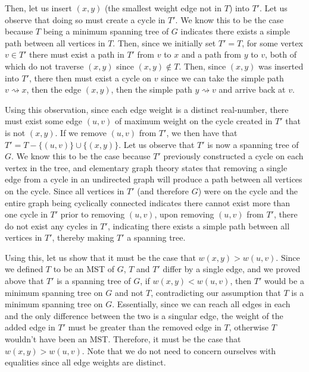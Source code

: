 \documentclass[11pt]{article}
\begin{document}
Then, let us insert $(x,y)$ (the smallest weight edge not in $T$) into $T'$. Let us observe that doing so must create a cycle in $T'$. We know this to be the case because $T$ being a minimum spanning tree of $G$ indicates there exists a simple path between all vertices in $T$. Then, since we initially set $T' = T$, for some vertex $v \in T'$ there must exist a path in $T'$ from $v$ to $x$ and a path from $y$ to $v$, both of which do not traverse $(x,y)$ since $(x,y) \notin T$. Then, since $(x,y)$ was inserted into $T'$, there then must exist a cycle on $v$ since we can take the simple path $v \rightsquigarrow x$, then the edge $(x,y)$, then the simple path $y \rightsquigarrow v$ and arrive back at $v$.

Using this observation, since each edge weight is a distinct real-number, there must exist some edge $(u,v)$ of maximum weight on the cycle created in $T'$ that is not $(x,y)$. If we remove $(u,v)$ from $T'$, we then have that $T' = T - \{(u,v)\} \cup \{(x,y)\}$. Let us observe that $T'$ is now a spanning tree of $G$. We know this to be the case because $T'$ previously constructed a cycle on each vertex in the tree, and elementary graph theory states that removing a single edge from a cycle in an undirected graph will produce a path between all vertices on the cycle. Since all vertices in $T'$ (and therefore $G$) were on the cycle and the entire graph being cyclically connected indicates there cannot exist more than one cycle in $T'$ prior to removing $(u,v)$, upon removing $(u,v)$ from $T'$, there do not exist any cycles in $T'$, indicating there exists a simple path between all vertices in $T'$, thereby making $T'$ a spanning tree.

Using this, let us show that it must be the case that $w(x,y) > w(u,v)$. Since we defined $T$ to be an MST of $G$, $T$ and $T'$ differ by a single edge, and we proved above that $T'$ is a spanning tree of $G$, if $w(x,y) < w(u,v)$, then $T'$ would be a minimum spanning tree on $G$ and not $T$, contradicting our assumption that $T$ is a minimum spanning tree on $G$. Essentially, since we can reach all edges in each and the only difference between the two is a singular edge, the weight of the added edge in $T'$ must be greater than the removed edge in $T$, otherwise $T$ wouldn't have been an MST. Therefore, it must be the case that $w(x,y) > w(u,v)$. Note that we do not need to concern ourselves with equalities since all edge weights are distinct.
\end{document}
